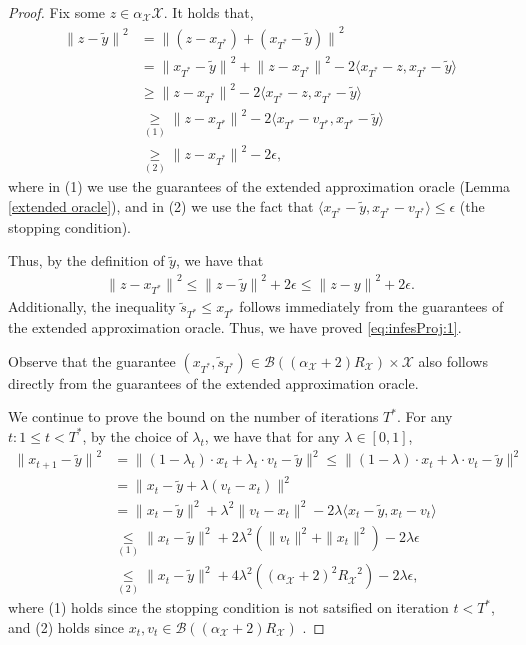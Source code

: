 \documentclass[a4paper,12pt]{article}
\newcommand{\mX}{\mathcal{X}}
\newcommand{\mB}{\mathcal{B}}
\begin{document}
\begin{proof}
Fix some $z \in \alpha_\mX \mX$. It holds that,
\begin{align*}
{\|z-\tilde{y}\|}^2 &= {\|(z-x_{T^*})+(x_{T^*}-\tilde{y})\|}^2 \\
&= {\|x_{T^*}-\tilde{y}\|}^2+{\|z-x_{T^*}\|}^2 - 2\langle{x_{T^*}-z, x_{T^*}-\tilde{y}}\rangle \\
&\geq {\|z-x_{T^*}\|}^2 - 2\langle{x_{T^*}-z, x_{T^*}-\tilde{y}}\rangle \\
&\underset{(1)}{\geq} {\|z-x_{T^*}\|}^2 - 2\langle{x_{T^*}-v_{T^*}, x_{T^*}-\tilde{y}}\rangle \\
&\underset{(2)}{\geq} {\|z-x_{T^*}\|}^2 - 2\epsilon,
\end{align*}
where in (1) we use the guarantees of the extended approximation oracle (Lemma \ref{extended oracle}), and in (2) we use the fact that $\langle{x_{T^*}-\tilde{y}, x_{T^*}-v_{T^*}}\rangle\leq \epsilon$ (the stopping condition).

Thus, by the definition of $\tilde{y}$, we have that
\begin{align*}
{\|z-x_{T^*}\|}^2 \leq {\|z-\tilde{y}\|}^2 + 2\epsilon \leq {\|z-y\|}^2 + 2\epsilon.
\end{align*}
Additionally, the inequality $\tilde{s}_{T^*} \leq x_{T^*}$ follows immediately from the guarantees of the extended approximation oracle. Thus, we have proved \eqref{eq:infesProj:1}. 

Observe that the guarantee $(x_{T^*},\tilde{s}_{T^*})\in\mB((\alpha_{\mX}+2)R_{\mX})\times\mX$ also follows directly from the guarantees of the extended approximation oracle.

We continue to prove the bound on the number of iterations $T^*$. For any $t: 1\leq t< T^*$, by the choice of $\lambda_t$, we have that for any $\lambda\in[0,1]$,
\begin{align*}
{\|x_{t+1}-\tilde{y}\|}^2 &= \|(1-\lambda_t)\cdot x_t + \lambda_t\cdot v_t-\tilde{y}\|^2 \leq  \|(1-\lambda)\cdot x_t + \lambda\cdot v_t-\tilde{y}\|^2 \\
&=  \|x_t-\tilde{y} +\lambda( v_t-x_t)\|^2\\
&=\|x_t-\tilde{y} \|^2+\lambda^2\|v_t-x_t\|^2 - 2\lambda\langle{x_t-\tilde{y}, x_t-v_t}\rangle \\
&\underset{(1)}{\leq}  \|x_t-\tilde{y} \|^2 +2{\lambda}^2(\|v_t\|^2+\|x_t\|^2)-2\lambda\epsilon \\
&\underset{(2)}{\leq} \|x_t-\tilde{y} \|^2 +4{\lambda}^2({(\alpha_\mX +2)}^2 {R_\mX}^2)-2\lambda\epsilon,
\end{align*}
where  (1) holds since the stopping condition is not satsified on iteration $t < T^*$, and (2) holds since  $x_t,v_t \in \mB((\alpha_{\mX} +2) R_{\mX})$ . 


\end{proof}
\end{document}
